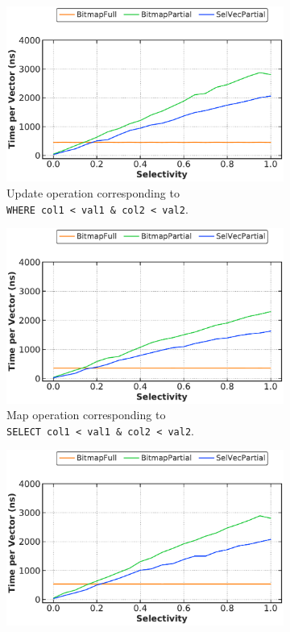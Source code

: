 \documentclass[12pt]{cmuthesis}
\begin{document}
\begin{figure}[t!]
\centering
\begin{subfigure}[t]{.49\linewidth}
 \centering
 \includegraphics[width=0.9\linewidth]{eval/bitwise_and_update.pdf}
 \caption{Update operation corresponding to \\ \texttt{\footnotesize WHERE col1 < val1 \& col2 < val2}.}
  \label{fig:bitwise_and_update}
\end{subfigure}%
\begin{subfigure}[t]{.49\linewidth}
 \centering
 \includegraphics[width=0.9\linewidth]{eval/bitwise_and_map.pdf}
 \caption{Map operation corresponding to \\ \texttt{\footnotesize SELECT col1 < val1 \& col2 < val2}.}
  \label{fig:bitwise_and_map}
\end{subfigure}
\begin{subfigure}[t]{.49\linewidth}
 \centering
 \includegraphics[width=0.9\linewidth]{eval/bitwise_or_update.pdf}

\end{subfigure}
\end{figure}
\end{document}
